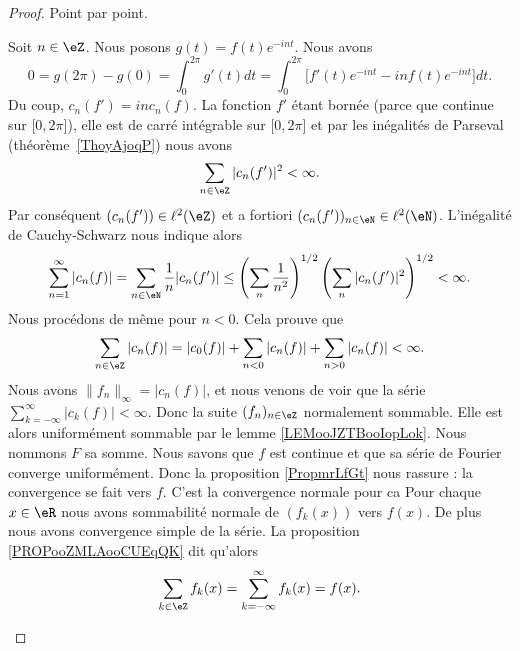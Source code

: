 \begin{proof}
	Point par point.
	\begin{subproof}
		Soit \( n\in \eZ\). Nous posons \( g(t)=f(t) e^{-int}\). Nous avons
		\begin{equation}
			0=g(2\pi)-g(0)=\int_0^{2\pi}g'(t)dt=\int_0^{2\pi}\big[ f'(t) e^{-int}-inf(t) e^{-int} \big]dt.
		\end{equation}
		Du coup, \( c_n(f')=inc_n(f)\). La fonction \( f'\) étant bornée (parce que continue sur \( \mathopen[ 0 , 2\pi \mathclose]\)), elle est de carré intégrable sur \( \mathopen[ 0 , 2\pi \mathclose]\) et par les inégalités de Parseval (théorème~\ref{ThoyAjoqP}) nous avons
		\begin{equation}
			\sum_{n\in \eZ}| c_n(f') |^2<\infty.
		\end{equation}
		Par conséquent \( (c_n(f'))\in \ell^2(\eZ)\) et a fortiori \( (c_n(f'))_{n\in \eN}\in \ell^2(\eN)\). L'inégalité de Cauchy-Schwarz nous indique alors
		\begin{equation}
			\sum_{n=1}^{\infty}| c_n(f) |=\sum_{n\in \eN}\frac{1}{ n }| c_n(f') |\leq \left( \sum_n\frac{1}{ n^2 } \right)^{1/2}\left( \sum_{n}| c_n(f') |^2 \right)^{1/2}<\infty.
		\end{equation}
		Nous procédons de même pour \( n<0\). Cela prouve que
		\begin{equation}
			\sum_{n\in \eZ}| c_n(f) | = |c_0(f)|+\sum_{n<0}| c_n(f) |+\sum_{n>0} | c_n(f) |  <\infty.
		\end{equation}
		Nous avons \( \| f_n \|_{\infty}=| c_n(f) |\), et nous venons de voir que la série \( \sum_{k=-\infty}^{\infty}| c_k(f) |<\infty\). Donc la suite \( (f_n)_{n\in \eZ}\) normalement sommable. Elle est alors uniformément sommable par le lemme \ref{LEMooJZTBooIopLok}. Nous nommons \( F\) sa somme.
		Nous savons que \( f\) est continue et que sa série de Fourier converge uniformément. Donc la proposition \ref{PropmrLfGt} nous rassure : la convergence se fait vers \( f\).
		C'est la convergence normale pour ca
		Pour chaque \( x\in \eR\) nous avons sommabilité normale de \( (f_k(x))\) vers \( f(x)\). De plus nous avons convergence simple de la série. La proposition \ref{PROPooZMLAooCUEqQK} dit qu'alors
		\begin{equation}
			\sum_{k\in \eZ}f_k(x)=\sum_{k=-\infty}^{\infty}f_k(x)=f(x).
		\end{equation}
	\end{subproof}
\end{proof}
